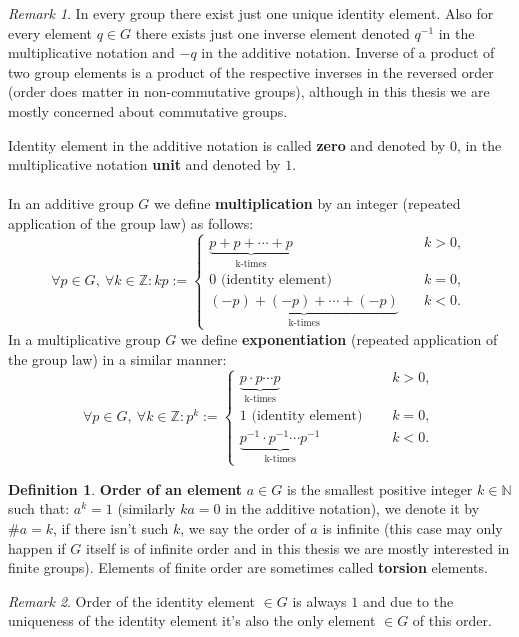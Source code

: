 \documentclass[thesis=M,english]{FITthesis}[2012/10/20]
\theoremstyle{remark}
\newtheorem*{RM}{Remark}
\theoremstyle{definition}
\newtheorem{DF}{Definition}[section]
\begin{document}
\begin{RM}
In every group there exist just one unique identity element. Also for every element $q \in G$ there exists just one inverse element denoted $q^{-1}$ in the multiplicative notation and $-q$ in the additive notation. Inverse of a product of two group elements is a product of the respective inverses in the reversed order (order does matter in non-commutative groups), although in this thesis we are mostly concerned about commutative groups.
\end{RM}
\noindent Identity element in the additive notation is called \textbf{zero} and denoted by $0$, in the multiplicative notation \textbf{unit} and denoted by $1$. \\ \\
In an additive group $G$ we define \textbf{multiplication} by an integer (repeated application of the group law) as follows:
$$
\forall p \in G,\ \forall k \in \mathbb{Z}: kp := \begin{cases} \underbrace{p + p + \cdots + p}_{\text{k-times}} &\quad k > 0, \\
0 \text{ (identity element) } &\quad k = 0, \\
\underbrace{(-p) + (-p) + \cdots + (-p)}_{\text{k-times}} &\quad k < 0.
\end{cases}
$$
In a multiplicative group $G$ we define \textbf{exponentiation} (repeated application of the group law) in a similar manner:
$$
\forall p \in G,\ \forall k \in \mathbb{Z}: p^k := \begin{cases} \underbrace{p \cdot p \cdots  p}_{\text{k-times}} &\quad k > 0, \\
1 \text{ (identity element) } &\quad k = 0, \\
\underbrace{p^{-1} \cdot p^{-1} \cdots  p^{-1}}_{\text{k-times}} &\quad k < 0.
\end{cases}
$$
\begin{DF}
\textbf{Order of an element} $a \in G$ is the smallest positive integer $k \in \mathbb{N}$ such that: $a^k = 1$ (similarly $ka = 0$ in the additive notation), we denote it by $\#a= k$, if there isn't such $k$, we say the order of $a$ is infinite (this case may only happen if $G$ itself is of infinite order and in this thesis we are mostly interested in finite groups). Elements of finite order are sometimes called \textbf{torsion} elements.
\end{DF}
\begin{RM}
Order of the identity element $\in G$ is always $1$ and due to the uniqueness of the identity element it's also the only element $\in G$ of this order.
\end{RM}
\end{document}
